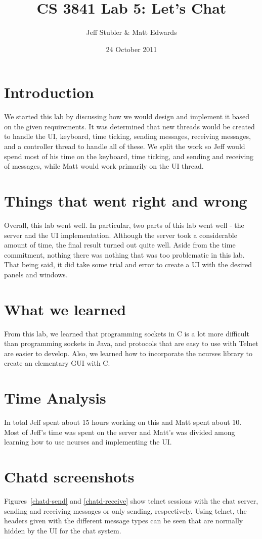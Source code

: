 \documentclass{article}
\begin{document}
\title{CS 3841 Lab 5: Let's Chat}
\author{Jeff Stubler \& Matt Edwards}
\date{24 October 2011}
\maketitle

\section*{Introduction}
We started this lab by discussing how we would design and implement it based on the given requirements. It was determined that new threads would be created to handle the UI, keyboard, time ticking, sending messages, receiving messages, and a controller thread to handle all of these. We split the work so Jeff would spend most of his time on the keyboard, time ticking, and sending and receiving of messages, while Matt would work primarily on the UI thread.

\section*{Things that went right and wrong}
Overall, this lab went well. In particular, two parts of this lab went well - the server and the UI implementation. Although the server took a considerable amount of time, the final result turned out quite well. Aside from the time commitment, nothing there was nothing that was too problematic in this lab. That being said, it did take some trial and error to create a UI with the desired panels and windows.

\section*{What we learned}
From this lab, we learned that programming sockets in C is a lot more difficult than programming sockets in Java, and protocols that are easy to use with Telnet are easier to develop. Also, we learned how to incorporate the ncurses library to create an elementary GUI with C.

\section*{Time Analysis}
In total Jeff spent about 15 hours working on this and Matt spent about 10. Most of Jeff's time was spent on the server and Matt's was divided among learning how to use ncurses and implementing the UI.

\section*{Chatd screenshots}
Figures~\ref{chatd-send} and \ref{chatd-receive} show telnet sessions with the chat server, sending and receiving messages or only sending, respectively. Using telnet, the headers given with
the different message types can be seen that are normally hidden by the UI for the chat system.
\end{document}
